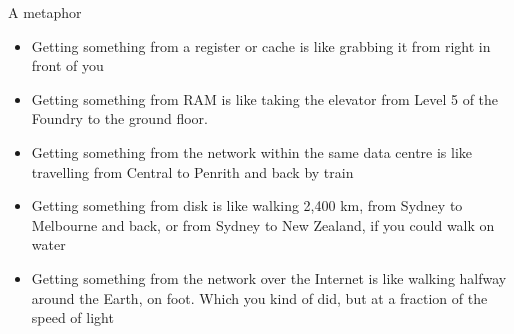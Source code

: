 \documentclass{beamer}
\begin{document}
\begin{frame}{A metaphor}
	\begin{itemize}
	\item Getting something from a register or cache is like grabbing it from right
	in front of you
	\item Getting something from RAM is like taking the elevator
	from Level 5 of the Foundry to the ground floor.

	\item Getting something from the network within the same data centre is like
	travelling from Central to Penrith and back by train
	
	\item Getting something from disk is like walking 2,400 km, from Sydney to
	Melbourne and back, or from Sydney to New Zealand, if you could walk on
	water
	
	\item Getting something from the network over the Internet is like walking halfway around the Earth,
	on foot.  Which you kind of did,
	but at a fraction of the speed of light
	\end{itemize}
\end{frame}
\end{document}
